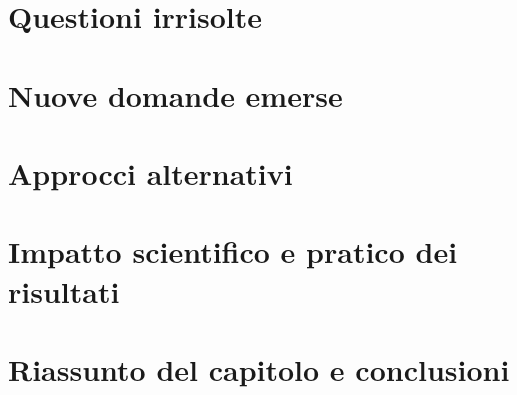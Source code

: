 \section{Questioni irrisolte}


\section{Nuove domande emerse}


\section{Approcci alternativi}


\section{Impatto scientifico e pratico dei risultati}

%
%

\section{Riassunto del capitolo e conclusioni}

